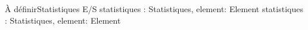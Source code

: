 	{À définir}{Statistiques}
	{E/S statistiques : Statistiques, element: Element}
	{statistiques : Statistiques, element: Element}{\naturel}